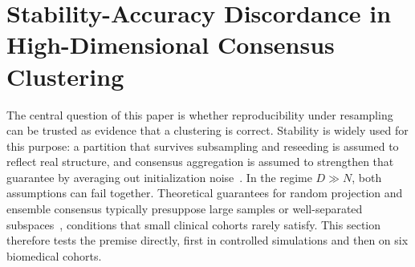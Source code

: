 \documentclass[pdflatex,sn-mathphys-num]{sn-jnl}
\theoremstyle{thmstyleone}
\theoremstyle{thmstyletwo}
\theoremstyle{thmstylethree}
\begin{document}
\begin{table}[!t]
\caption{Clustering methods considered in this study and their handling of high-dimensional noise}
\label{tab:taxonomy_comparison}
\centering
{}
\end{table}


\section{Stability-Accuracy Discordance in High-Dimensional Consensus Clustering}\label{sec:falsification}

The central question of this paper is whether reproducibility under resampling can be trusted as evidence that a clustering is correct. Stability is widely used for this purpose: a partition that survives subsampling and reseeding is assumed to reflect real structure, and consensus aggregation is assumed to strengthen that guarantee by averaging out initialization noise~\cite{fred2005combining}. In the regime $D \gg N$, both assumptions can fail together. Theoretical guarantees for random projection and ensemble consensus typically presuppose large samples or well-separated subspaces~\cite{zhang2024optimal}, conditions that small clinical cohorts rarely satisfy. This section therefore tests the premise directly, first in controlled simulations and then on six biomedical cohorts.
\end{document}
